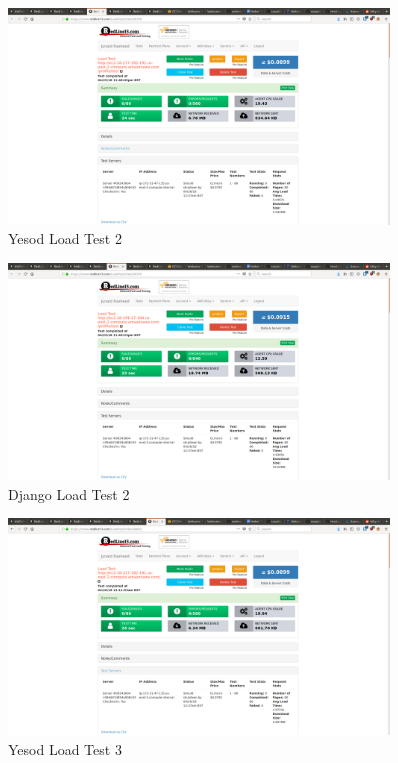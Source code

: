 \begin{figure}[H]
	\centering
	\includegraphics[width=0.9\textwidth]{final_report/pics/yesodLoadTest2.png}
	\caption{Yesod Load Test 2}
	\label{fig:yesodLoadTest2}
\end{figure}

\begin{figure}[H]
	\centering
	\includegraphics[width=0.9\textwidth]{final_report/pics/djangoLoadTest2.png}
	\caption{Django Load Test 2}
	\label{fig:djangoLoadTest2}
\end{figure}

\begin{figure}[H]
	\centering
	\includegraphics[width=0.9\textwidth]{final_report/pics/yesodLoadTest3.png}
	\caption{Yesod Load Test 3}
	\label{fig:yesodLoadTest3}
\end{figure}

